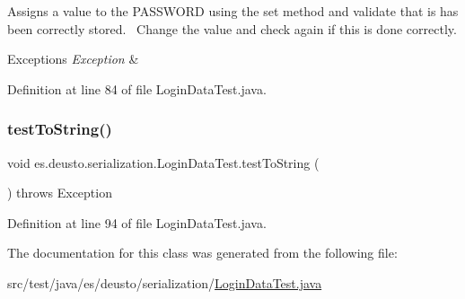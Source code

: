 Assigns a value to the P\+A\+S\+S\+W\+O\+RD using the set method and validate that is has been correctly stored.~\newline
Change the value and check again if this is done correctly. 
\begin{DoxyExceptions}{Exceptions}
{\em Exception} & \\
\hline
\end{DoxyExceptions}


Definition at line 84 of file Login\+Data\+Test.\+java.

\mbox{\label{classes_1_1deusto_1_1serialization_1_1_login_data_test_a3eae0dd2b793998614e5d6ac75c694ed}} 
\subsubsection{\texorpdfstring{test\+To\+String()}{testToString()}}
{\footnotesize\ttfamily void es.\+deusto.\+serialization.\+Login\+Data\+Test.\+test\+To\+String (\begin{DoxyParamCaption}{ }\end{DoxyParamCaption}) throws Exception}



Definition at line 94 of file Login\+Data\+Test.\+java.



The documentation for this class was generated from the following file\+:\begin{DoxyCompactItemize}
\item 
src/test/java/es/deusto/serialization/\hyperlink{_login_data_test_8java}{Login\+Data\+Test.\+java}\end{DoxyCompactItemize}

